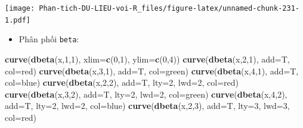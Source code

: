 \documentclass[
]{book}
\newenvironment{Shaded}{\begin{snugshade}}{\end{snugshade}}
\newcommand{\DataTypeTok}[1]{\textcolor[rgb]{0.13,0.29,0.53}{#1}}
\newcommand{\DecValTok}[1]{\textcolor[rgb]{0.00,0.00,0.81}{#1}}
\newcommand{\KeywordTok}[1]{\textcolor[rgb]{0.13,0.29,0.53}{\textbf{#1}}}
\newcommand{\NormalTok}[1]{#1}
\newcommand{\StringTok}[1]{\textcolor[rgb]{0.31,0.60,0.02}{#1}}
\providecommand{\tightlist}{%
  \setlength{\itemsep}{0pt}\setlength{\parskip}{0pt}}
\begin{document}
\texttt{[image: Phan-tich-DU-LIEU-voi-R\_files/figure-latex/unnamed-chunk-231-1.pdf]}

\begin{itemize}
\tightlist
\item
  Phân phối \texttt{beta}:
\end{itemize}

\begin{Shaded}
\begin{Highlighting}[]
\KeywordTok{curve}\NormalTok{(}\KeywordTok{dbeta}\NormalTok{(x,}\DecValTok{1}\NormalTok{,}\DecValTok{1}\NormalTok{), }\DataTypeTok{xlim=}\KeywordTok{c}\NormalTok{(}\DecValTok{0}\NormalTok{,}\DecValTok{1}\NormalTok{), }\DataTypeTok{ylim=}\KeywordTok{c}\NormalTok{(}\DecValTok{0}\NormalTok{,}\DecValTok{4}\NormalTok{))}
\KeywordTok{curve}\NormalTok{(}\KeywordTok{dbeta}\NormalTok{(x,}\DecValTok{2}\NormalTok{,}\DecValTok{1}\NormalTok{), }\DataTypeTok{add=}\NormalTok{T, }\DataTypeTok{col=}\StringTok{\textquotesingle{}red\textquotesingle{}}\NormalTok{)}
\KeywordTok{curve}\NormalTok{(}\KeywordTok{dbeta}\NormalTok{(x,}\DecValTok{3}\NormalTok{,}\DecValTok{1}\NormalTok{), }\DataTypeTok{add=}\NormalTok{T, }\DataTypeTok{col=}\StringTok{\textquotesingle{}green\textquotesingle{}}\NormalTok{)}
\KeywordTok{curve}\NormalTok{(}\KeywordTok{dbeta}\NormalTok{(x,}\DecValTok{4}\NormalTok{,}\DecValTok{1}\NormalTok{), }\DataTypeTok{add=}\NormalTok{T, }\DataTypeTok{col=}\StringTok{\textquotesingle{}blue\textquotesingle{}}\NormalTok{)}
\KeywordTok{curve}\NormalTok{(}\KeywordTok{dbeta}\NormalTok{(x,}\DecValTok{2}\NormalTok{,}\DecValTok{2}\NormalTok{), }\DataTypeTok{add=}\NormalTok{T, }\DataTypeTok{lty=}\DecValTok{2}\NormalTok{, }\DataTypeTok{lwd=}\DecValTok{2}\NormalTok{, }\DataTypeTok{col=}\StringTok{\textquotesingle{}red\textquotesingle{}}\NormalTok{)}
\KeywordTok{curve}\NormalTok{(}\KeywordTok{dbeta}\NormalTok{(x,}\DecValTok{3}\NormalTok{,}\DecValTok{2}\NormalTok{), }\DataTypeTok{add=}\NormalTok{T, }\DataTypeTok{lty=}\DecValTok{2}\NormalTok{, }\DataTypeTok{lwd=}\DecValTok{2}\NormalTok{, }\DataTypeTok{col=}\StringTok{\textquotesingle{}green\textquotesingle{}}\NormalTok{)}
\KeywordTok{curve}\NormalTok{(}\KeywordTok{dbeta}\NormalTok{(x,}\DecValTok{4}\NormalTok{,}\DecValTok{2}\NormalTok{), }\DataTypeTok{add=}\NormalTok{T, }\DataTypeTok{lty=}\DecValTok{2}\NormalTok{, }\DataTypeTok{lwd=}\DecValTok{2}\NormalTok{, }\DataTypeTok{col=}\StringTok{\textquotesingle{}blue\textquotesingle{}}\NormalTok{)}
\KeywordTok{curve}\NormalTok{(}\KeywordTok{dbeta}\NormalTok{(x,}\DecValTok{2}\NormalTok{,}\DecValTok{3}\NormalTok{), }\DataTypeTok{add=}\NormalTok{T, }\DataTypeTok{lty=}\DecValTok{3}\NormalTok{, }\DataTypeTok{lwd=}\DecValTok{3}\NormalTok{, }\DataTypeTok{col=}\StringTok{\textquotesingle{}red\textquotesingle{}}\NormalTok{)}

\end{Highlighting}
\end{Shaded}
\end{document}
